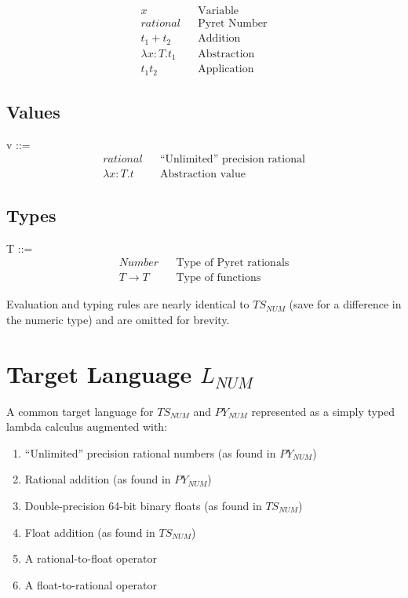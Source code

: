 \documentclass{article}
\begin{document}
	\begin{align*}
	x											&& \text{Variable}\\
	rational  									&& \text{Pyret Number} \\
	t_1 + t_2 									&& \text{Addition} \\
	\lambda x \colon T.t_1						&& \text{Abstraction} \\
	t_1 t_2										&& \text{Application}
	\end{align*}
	
	
	\subsection{Values}
	v ::=
	\begin{align*}
		rational							&& \text{``Unlimited'' precision rational} \\
		\lambda x \colon T.t						&& \text{Abstraction value}
	\end{align*}
	
	
	\subsection{Types}
	T ::=
	\begin{align*}
		Number												&& \text{Type of Pyret rationals}\\
		T \rightarrow T										&& \text{Type of functions}
	\end{align*}
		
	Evaluation and typing rules are nearly identical to $TS_{NUM}$ (save for a difference in the numeric type) and are omitted for brevity.


	\section{Target Language $L_{NUM}$}
	A common target language for $TS_{NUM}$ and $PY_{NUM}$ represented as a simply typed lambda calculus augmented with:
	\begin{enumerate}
		\item ``Unlimited'' precision rational numbers (as found in $PY_{NUM}$)
		\item Rational addition (as found in $PY_{NUM}$)
		\item Double-precision 64-bit binary floats (as found in $TS_{NUM}$)
		\item Float addition (as found in $TS_{NUM}$)
		\item A rational-to-float operator
		\item A float-to-rational operator
	\end{enumerate}
\end{document}
